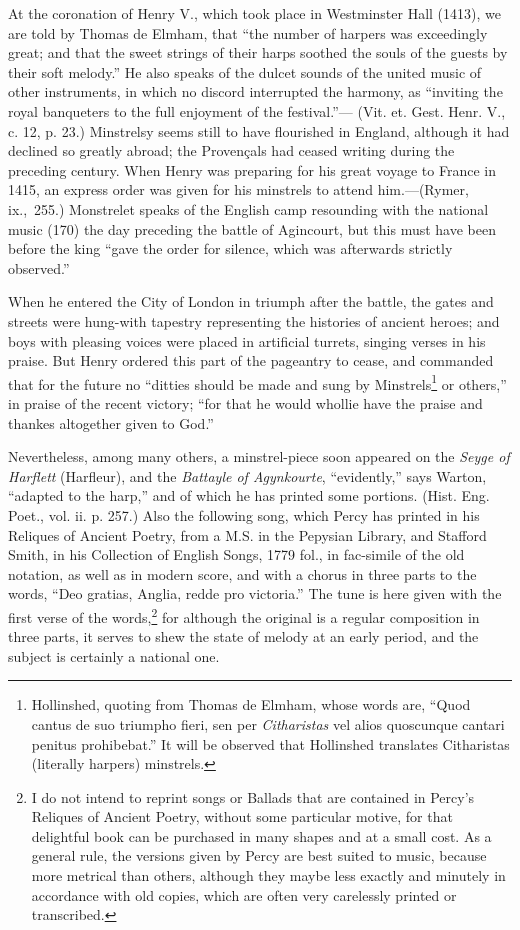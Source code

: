 At the coronation of Henry V., which took place in Westminster Hall (1413),
we are told by Thomas de Elmham, that “the number of harpers was exceedingly
great; and that the sweet strings of their harps soothed the souls of the guests
by their soft melody.” He also speaks of the dulcet sounds of the united
music of other instruments, in which no discord interrupted the harmony,
as “inviting the royal banqueters to the full enjoyment of the festival.”—
(Vit. et. Gest. Henr. V., c. 12, p. 23.) Minstrelsy seems still to have
flourished in England, although it had declined so greatly abroad; the Provençals
had ceased writing during the preceding century. When Henry was preparing
for his great voyage to France in 1415, an express order was given for his
minstrels to attend him.—(Rymer, ix.,~255.) Monstrelet speaks of the English
camp resounding with the national music (170) the day preceding the battle of
Agincourt, but this must have been before the king “gave the order for silence,
which was afterwards strictly observed.”

When he entered the City of London in triumph after the battle, the gates and
streets were hung-with tapestry representing the histories of ancient heroes; and
boys with pleasing voices were placed in artificial turrets, singing verses in his
praise. But Henry ordered this part of the pageantry to cease, and commanded
that for the future no “ditties should be made and sung by Minstrels\footnote{
Hollinshed, quoting from Thomas de Elmham, whose
words are, “Quod cantus de suo triumpho fieri, sen per
\textit{Citharistas} vel alios quoscunque cantari penitus prohibebat.”
It will be observed that Hollinshed translates
Citharistas (literally harpers) minstrels.
} or others,”
in praise of the recent victory; “for that he would whollie have the praise
and thankes altogether given to God.”

Nevertheless, among many others, a minstrel-piece soon appeared on the
\textit{Seyge of Harflett} (Harfleur), and the \textit{Battayle of Agynkourte}, “evidently,” says
Warton, “adapted to the harp,” and of \pagebreak
 which he has printed some portions.
(Hist. Eng. Poet., vol. ii. p. 257.) Also the following song, which Percy has
printed in his Reliques of Ancient Poetry, from a M.S. in the Pepysian Library,
and Stafford Smith, in his Collection of English Songs, 1779 fol., in fac-simile of
the old notation, as well as in modern score, and with a chorus in three parts to
the words, “Deo gratias, Anglia, redde pro victoria.” The tune is here given
with the first verse of the words,\footnote{
I do not intend to reprint songs or Ballads that are
contained in Percy's Reliques of Ancient Poetry, without
some particular motive, for that delightful book can be
purchased in many shapes and at a small cost. As a
general rule, the versions given by Percy are best suited
to music, because more metrical than others, although
they maybe less exactly and minutely in accordance
with old copies, which are often very carelessly printed
or transcribed.
} for although the original is a regular composition
in three parts, it serves to shew the state of melody at an early period, and
the subject is certainly a national one.

